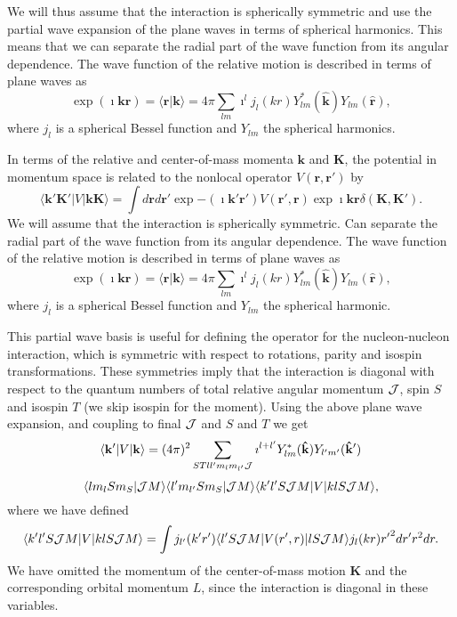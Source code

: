 \documentclass[graybox,sectrefs,envcountresetchap,open=right]{svmonodo}
\begin{document}
We will thus assume that the interaction is spherically symmetric and use
the partial wave expansion of the plane waves in
terms of spherical harmonics.
This means that we can separate the radial part of the wave function from its
angular dependence. The wave function of the relative motion is described
in terms of plane waves as
\[
\exp{(\imath \mathbf{kr})}=\langle\mathbf{r}\vert\mathbf{k}\rangle=4\pi\sum_{lm}\imath^{l}j_{l}(kr)Y_{lm}^{*}(\mathbf{\hat{k}})Y_{lm}(\mathbf{\hat{r}}),
\]
where $j_l$ is a spherical Bessel function and $Y_{lm}$ the
spherical harmonics.



In terms of the relative and center-of-mass momenta $\mathbf{k}$ and
$\mathbf{K}$, the potential in momentum space is related to the nonlocal operator
$V(\mathbf{r},\mathbf{r}')$ by
\[
\langle\mathbf{k'K'}\vert V \vert \mathbf{kK}\rangle =\int d\mathbf{r}d \mathbf{r'}
        \exp{-(\imath \mathbf{k'r'})}V(\mathbf{r'},\mathbf{r})\exp{\imath \mathbf{kr}}\delta(\mathbf{K},\mathbf{K'}).
\]
We will assume that the interaction is spherically symmetric.
Can separate the radial part of the wave function from its
angular dependence. The wave function of the relative motion is described
in terms of plane waves as
\[
\exp{(\imath \mathbf{kr})} =\langle\mathbf{r}\vert\mathbf{k}\rangle= 4\pi\sum_{lm}\imath^{l}j_{l}(kr)Y_{lm}^{*}(\mathbf{\hat{k}})Y_{lm}(\mathbf{\hat{r}}),
\]
where $j_l$ is a spherical Bessel function and $Y_{lm}$ the
spherical harmonic.



This partial wave basis is useful for defining the operator for
the nucleon-nucleon interaction, which
is symmetric with respect to rotations, parity and
isospin transformations. These symmetries imply that the interaction is
diagonal with respect to the quantum numbers of total relative angular
momentum ${\cal J}$, spin $S$ and isospin $T$ (we skip isospin for the moment). Using the above plane wave expansion,
and coupling to final ${\cal J}$ and $S$ and $T$ we get
\[
 \langle\mathbf{k'}\vert V \vert\mathbf{k}\rangle= (4\pi)^2 \sum_{STll'm_lm_{l'}{\cal J}}\imath^{l+l'} Y_{lm}^{*}(\mathbf{\hat{k}}) Y_{l'm'}(\mathbf{\hat{k}'})
\]
\[
\langle lm_lSm_S|{\cal J}M\rangle \langle l'm_{l'}Sm_S|{\cal J}M\rangle\langle k'l'S{\cal J}M\vert V \vert klS{\cal J}M\rangle,
\]
where we have defined
\[
    \langle k'l'S{\cal J}M\vert V \vert klS{\cal J}M\rangle=\int j_{l'}(k'r')\langle l'S{\cal J}M\vert V(r',r)\vert lS{\cal J}M\rangle j_l(kr) {r'}^2 dr' r^2 dr.
\]
We have omitted the momentum of the center-of-mass motion $\mathbf{K}$ and the 
corresponding orbital momentum $L$, since the interaction is diagonal
in these variables.
\end{document}
